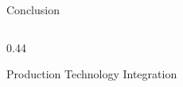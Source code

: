 \documentclass[11pt, aspectratio=169]{beamer}
\begin{document}
\begin{frame}{Conclusion}
\begin{columns}[T]
\begin{column}{0.44\textwidth}
\begin{exampleblock}{\footnotesize Production Technology Integration}
      \vspace{0.01cm}
    \end{exampleblock}
  \end{column}
\end{columns}
\end{frame}
\end{document}
